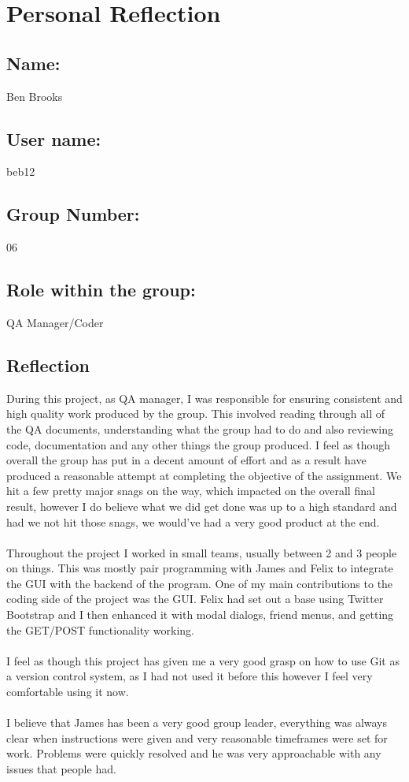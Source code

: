 \documentclass[10pt,a4paper]{article}
\begin{document}
\section{Personal Reflection}
\subsection{Name:}
Ben Brooks
\subsection{User name:}
beb12
\subsection{Group Number:}
06
\subsection{Role within the group:}
QA Manager/Coder
\subsection{Reflection}
During this project, as QA manager, I was responsible for ensuring consistent and high quality work produced by the group. This involved reading through all of the QA documents, understanding what the group had to do and also reviewing code, documentation and any other things the group produced. I feel as though overall the group has put in a decent amount of effort and as a result have produced a reasonable attempt at completing the objective of the assignment. We hit a few pretty major snags on the way, which impacted on the overall final result, however I do believe what we did get done was up to a high standard and had we not hit those snags, we would've had a very good product at the end.\\
\\
Throughout the project I worked in small teams, usually between 2 and 3 people on things. This was mostly pair programming with James and Felix to integrate the GUI with the backend of the program. One of my main contributions to the coding side of the project was the GUI. Felix had set out a base using Twitter Bootstrap and I then enhanced it with modal dialogs, friend menus, and getting the GET/POST functionality working.\\
\\
I feel as though this project has given me a very good grasp on how to use Git as a version control system, as I had not used it before this however I feel very comfortable using it now.\\
\\
I believe that James has been a very good group leader, everything was always clear when instructions were given and very reasonable timeframes were set for work. Problems were quickly resolved and he was very approachable with any issues that people had.
\end{document}
